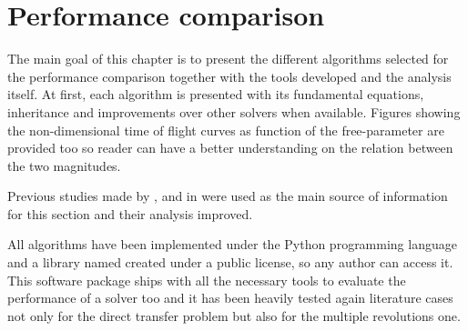 \chapter{Performance comparison}

The main goal of this chapter is to present the different algorithms selected
for the performance comparison together with the tools developed and the
analysis itself. At first, each algorithm is presented with its
fundamental equations, inheritance and improvements over other solvers
when available. Figures showing the non-dimensional time of flight curves as
function of the free-parameter are provided too so reader can have a better
understanding on the relation between the two magnitudes.

Previous studies made by \cite{klumpp1999}, \cite{torre2015} and in
\cite{martinez2021} were used as the main source of information for this section
and their analysis improved. 

All algorithms have been implemented under the Python programming language and a
library named  created under a public license, so any
author can access it. This software package ships with all the necessary tools
to evaluate the performance of a solver too and it has been heavily tested again
literature cases not only for the direct transfer problem but also for the
multiple revolutions one.


